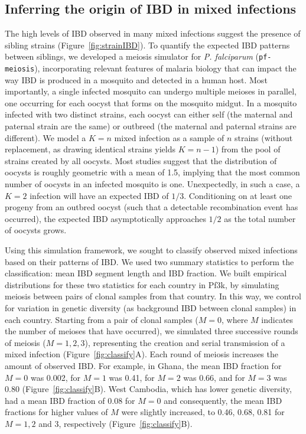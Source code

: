 \documentclass[9pt,lineno]{elife}
\begin{document}
\subsection{Inferring the origin of IBD in mixed infections}

The high levels of IBD observed in many mixed infections suggest the presence of sibling strains (Figure~\ref{fig:strainIBD}). To quantify the expected IBD patterns between siblings, we developed a meiosis simulator for {\it P. falciparum} ({\tt pf-meiosis}), incorporating relevant features of malaria biology that can impact the way IBD is produced in a mosquito and detected in a human host. Most importantly, a single infected mosquito can undergo multiple meioses in parallel, one occurring for each oocyst that forms on the mosquito midgut.  In a mosquito infected with two distinct strains, each oocyst can either self (the maternal and paternal strain are the same) or outbreed (the maternal and paternal strains are different). We model a $K = n$ mixed infection as a sample of $n$ strains (without replacement, as drawing identical strains yields $K = n-1$) from the pool of strains created by all oocysts. Most studies suggest that the distribution of oocysts is roughly geometric with a mean of 1.5, implying that the most common number of oocysts in an infected mosquito is one. Unexpectedly, in such a case, a $K=2$ infection will have an expected IBD of $1/3$. Conditioning on at least one progeny from an outbred oocyst (such that a detectable recombination event has occurred), the expected IBD asymptotically approaches $1/2$ as the total number of oocysts grows.

Using this simulation framework, we sought to classify observed mixed infections based on their patterns of IBD. We used two summary statistics to perform the classification: mean IBD segment length and IBD fraction. We built empirical distributions for these two statistics for each country in Pf3k, by simulating meiosis between pairs of clonal samples from that country.  In this way, we control for variation in genetic diversity (as background IBD between clonal samples) in each country. Starting from a pair of clonal samples ($M=0$, where $M$ indicates the number of meioses that have occurred), we simulated three successive rounds of meiosis ($M=1, 2, 3$), representing the creation and serial transmission of a mixed infection (Figure~\ref{fig:classify}A). Each round of meiosis increases the amount of observed IBD. For example, in Ghana, the mean IBD fraction for $M=0$ was 0.002, for $M=1$ was 0.41, for $M=2$ was 0.66, and for $M=3$ was 0.80 (Figure~\ref{fig:classify}B). West Cambodia, which has lower genetic diversity, had a mean IBD fraction of 0.08 for $M=0$ and consequently, the mean IBD fractions for higher values of $M$ were slightly increased, to 0.46, 0.68, 0.81 for $M=1, 2$ and $3$, respectively (Figure~\ref{fig:classify}B).
\end{document}
